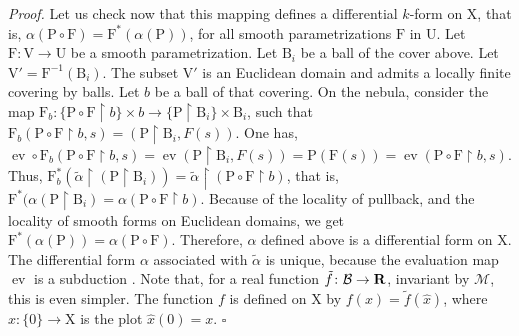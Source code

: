 \documentclass[12pt,reqno]{amsart}
\theoremstyle{article}
\renewenvironment{proof}{\noindent \textit{Proof.}} {\nolinebreak\hfill $\square$}
\def \B{\mathrm B}
\def \F{\mathrm F}
\def \P{\mathrm P}
\def \U{\mathrm U}
\def \V{\mathrm V}
\def \X{\mathrm X}
\newcommand{\RR}{{\bf R}}
\newcommand{\cB}{{\mathcal B}}
\newcommand{\cM}{\mathcal{M}}
\DeclareMathOperator{\ev}{ev}
\begin{document}
\begin{proof}
    Let us check now that this mapping defines a differential $k$-form on $\X$,
    that is,
    $\alpha(\P \circ \F) = \F^*(\alpha(\P))$,
    for all smooth parametrizations $\F$ in $\U$.
    Let $\F \colon \V \to \U$ be a smooth parametrization.
    Let $\B_i$ be a ball of the cover above.
    Let $\V' = \F^{-1}(\B_i)$.
    The subset $\V'$ is an Euclidean domain and admits a locally finite covering by balls.
    Let $b$ be a ball of that covering.
    On the nebula,
    consider the map $\F_b \colon \{\P \circ \F \restriction b\}\times b \to \{\P \restriction \B_i\} \times \B_i$,
    such that $\F_b(\P \circ \F \restriction b, s) = (\P \restriction \B_i,F(s))$.
    One has,
    $\ev \circ \F_b(\P \circ \F \restriction b, s) = \ev(\P \restriction \B_i,F(s)) = \P(\F(s)) = \ev(\P \circ \F \restriction b, s)$.
    Thus,
    $\F_b^*(\tilde\alpha \restriction (\P \restriction \B_i)) = \tilde\alpha \restriction (\P \circ \F \restriction b)$,
    that is,
    $\F^*(\alpha(\P\restriction \B_i) = \alpha(\P \circ \F \restriction b)$.
    Because of the locality of pullback,
    and the locality of smooth forms on Euclidean domains,
    we get $\F^*(\alpha(\P)) = \alpha(\P \circ \F)$.
    Therefore,
    $\alpha$ defined above  is a differential form on $\X$.
    The differential form $\alpha$ associated with $\tilde\alpha$ is unique,
    because the evaluation map $\ev$ is a subduction \cite[ \& 6.39]{PIZ13}.
    Note that,
    for a real function $\tilde f \colon \cB \to \RR$,
    invariant by $\cM$,
    this is even simpler.
    The function $f$ is defined on $\X$ by $f(x) = \tilde f(\hat x)$,
    where $\hat x \colon \{0\} \to \X$ is the plot $\hat x(0) = x$.
  \end{proof}
  
\end{document}
